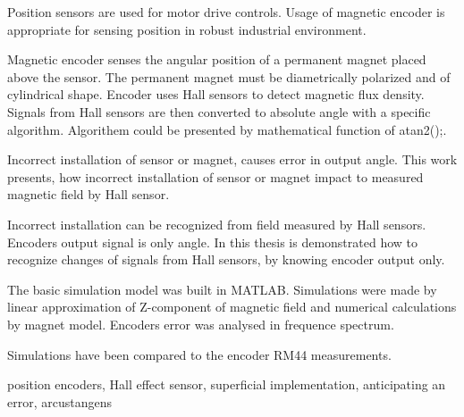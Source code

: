 \documentclass[a4paper,twoside,openright,12pt]{book}
\begin{document}
Position sensors are used for motor drive controls.
Usage of magnetic encoder is appropriate for sensing position in robust industrial environment.

Magnetic encoder senses the angular position of a permanent magnet placed above the sensor.
The permanent magnet must be diametrically polarized and of cylindrical shape.
Encoder uses Hall sensors to detect magnetic flux density.
Signals from Hall sensors are then converted to absolute angle with a specific algorithm.
Algorithem could be presented by mathematical function of atan2();.

Incorrect installation of sensor or magnet, causes error in output angle.
This work presents, how incorrect installation of sensor or magnet  impact to measured magnetic field by Hall sensor.

Incorrect installation can be recognized from field measured by Hall sensors. Encoders output signal is only angle.
In this thesis is demonstrated how to recognize changes of signals from Hall sensors, by knowing encoder output only.

The basic simulation model was built in MATLAB. Simulations were  made  by linear approximation of Z-component of magnetic field and numerical calculations by magnet model.
Encoders error was analysed in frequence spectrum.

Simulations have been compared to the encoder RM44 measurements.

\keywords position encoders, Hall effect sensor, superficial implementation, anticipating an error, arcustangens









\end{document}
